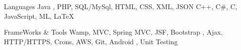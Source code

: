 


\begin{cvskills}


\cvskill
{Languages} %
{ Java , PHP, SQL/MySql, HTML, CSS, XML, JSON C++, C\#, C, JavaScript, ML, LaTeX} %


\cvskill
{FrameWorks \& Tools} %
{ Wamp, MVC, Spring MVC, JSF, Bootstrap , Ajax, HTTP/HTTPS, Crons, AWS, Git, Android , Unit Testing} %



\end{cvskills}